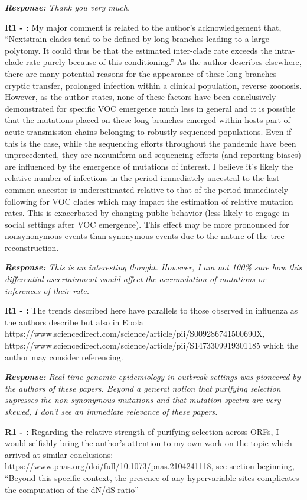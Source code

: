\documentclass[aps,rmp,onecolumn]{revtex4-1}
\newcounter{counter1}[section]
\newcounter{counter2}[section]
\newcounter{counter3}[section]
\newcommand{\refa}[1]{\vskip 5mm \textbf{R1 - \stepcounter{counter1}\arabic{counter1}:} #1}
\newcommand{\response}[1]{{\it {\color{response}\textbf{Response:} #1}}\vskip 5mm}
\begin{document}
\response{Thank you very much.}

\refa{My major comment is related to the author's acknowledgement that, ``Nextstrain clades tend to be defined by long branches leading to a large polytomy. It could thus be that the estimated inter-clade rate exceeds the intra-clade rate purely because of this conditioning.'' As the author describes elsewhere, there are many potential reasons for the appearance of these long branches -- cryptic transfer, prolonged infection within a clinical population, reverse zoonosis. However, as the author states, none of these factors have been conclusively demonstrated for specific VOC emergence much less in general and it is possible that the mutations placed on these long branches emerged within hosts part of acute transmission chains belonging to robustly sequenced populations. Even if this is the case, while the sequencing efforts throughout the pandemic have been unprecedented, they are nonuniform and sequencing efforts (and reporting biases) are influenced by the emergence of mutations of interest. I believe it's likely the relative number of infections in the period immediately ancestral to the last common ancestor is underestimated relative to that of the period immediately following for VOC clades which may impact the estimation of relative mutation rates. This is exacerbated by changing public behavior (less likely to engage in social settings after VOC emergence). This effect may be more pronounced for nonsynonymous events than synonymous events due to the nature of the tree reconstruction.}

\response{This is an interesting thought. However, I am not 100\% sure how this differential ascertainment would affect the accumulation of mutations or inferences of their rate.}

\refa{The trends described here have parallels to those observed in influenza as the authors describe but also in Ebola https://www.sciencedirect.com/science/article/pii/S009286741500690X, https://www.sciencedirect.com/science/article/pii/S1473309919301185 which the author may consider referencing.}

\response{Real-time genomic epidemiology in outbreak settings was pioneered by the authors of these papers. Beyond a general notion that purifying selection supresses the non-synonymous mutations and that mutation spectra are very skewed, I don't see an immediate relevance of these papers. }

\refa{Regarding the relative strength of purifying selection across ORFs, I would selfishly bring the author's attention to my own work on the topic which arrived at similar conclusions: https://www.pnas.org/doi/full/10.1073/pnas.2104241118, see section beginning, ``Beyond this specific context, the presence of any hypervariable sites complicates the computation of the dN/dS ratio''}
\end{document}
